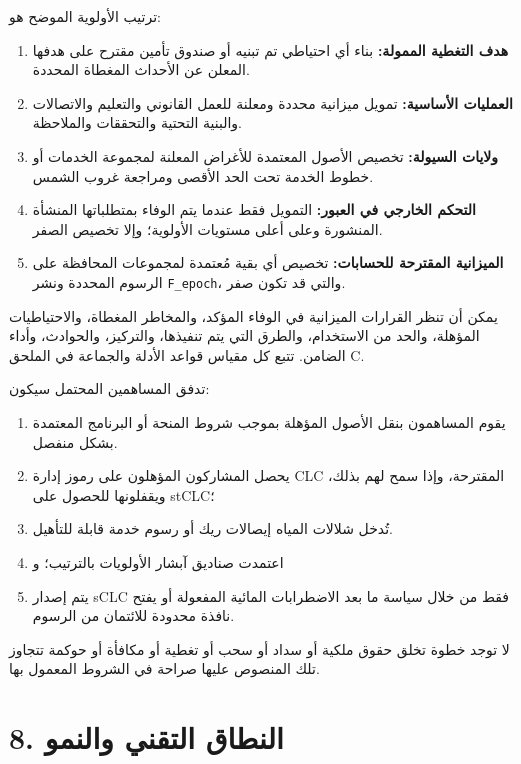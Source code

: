 \documentclass[11pt]{article}
\begin{document}
ترتيب الأولوية الموضح هو:

\begin{enumerate}[leftmargin=*]
\item \textbf{هدف التغطية الممولة:} بناء أي احتياطي تم تبنيه أو صندوق تأمين مقترح على هدفها المعلن عن الأحداث المغطاة المحددة.
\item \textbf{العمليات الأساسية:} تمويل ميزانية محددة ومعلنة للعمل القانوني والتعليم والاتصالات والبنية التحتية والتحققات والملاحظة.
\item \textbf{ولايات السيولة:} تخصيص الأصول المعتمدة للأغراض المعلنة لمجموعة الخدمات أو خطوط الخدمة تحت الحد الأقصى ومراجعة غروب الشمس.
\item \textbf{التحكم الخارجي في العبور:} التمويل فقط عندما يتم الوفاء بمتطلباتها المنشأة المنشورة وعلى أعلى مستويات الأولوية؛ وإلا تخصيص الصفر.
\item \textbf{الميزانية المقترحة للحسابات:} تخصيص أي بقية مُعتمدة لمجموعات المحافظة على الرسوم المحددة ونشر \texttt{F\_epoch}، والتي قد تكون صفر.
\end{enumerate}
يمكن أن تنظر القرارات الميزانية في الوفاء المؤكد، والمخاطر المغطاة، والاحتياطيات المؤهلة، والحد من الاستخدام، والطرق التي يتم تنفيذها، والتركيز، والحوادث، وأداء الضامن. تتبع كل مقياس قواعد الأدلة والجماعة في الملحق C.

تدفق المساهمين المحتمل سيكون:

\begin{enumerate}[leftmargin=*]
\item يقوم المساهمون بنقل الأصول المؤهلة بموجب شروط المنحة أو البرنامج المعتمدة بشكل منفصل.
\item يحصل المشاركون المؤهلون على رموز إدارة CLC المقترحة، وإذا سمح لهم بذلك، ويقفلونها للحصول على stCLC؛
\item تُدخل شلالات المياه إيصالات ريك أو رسوم خدمة قابلة للتأهيل.
\item اعتمدت صناديق آبشار الأولويات بالترتيب؛ و
\item يتم إصدار sCLC فقط من خلال سياسة ما بعد الاضطرابات المائية المفعولة أو يفتح نافذة محدودة للائتمان من الرسوم.
\end{enumerate}
لا توجد خطوة تخلق حقوق ملكية أو سداد أو سحب أو تغطية أو مكافأة أو حوكمة تتجاوز تلك المنصوص عليها صراحة في الشروط المعمول بها.


\section*{8. النطاق التقني والنمو}
\end{document}
